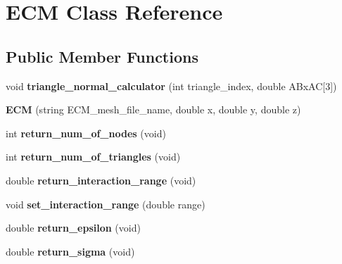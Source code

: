 \hypertarget{classECM}{}\section{E\+CM Class Reference}
\label{classECM}
\subsection*{Public Member Functions}
\begin{DoxyCompactItemize}
\item 
void {\bfseries triangle\+\_\+normal\+\_\+calculator} (int triangle\+\_\+index, double A\+Bx\+AC\mbox{[}3\mbox{]})\hypertarget{classECM_a004ef7f13acbefa4cfa69e0b5dfc57f2}{}\label{classECM_a004ef7f13acbefa4cfa69e0b5dfc57f2}

\item 
{\bfseries E\+CM} (string E\+C\+M\+\_\+mesh\+\_\+file\+\_\+name, double x, double y, double z)\hypertarget{classECM_ae59f09758a280ce73f6657edb2e3b67f}{}\label{classECM_ae59f09758a280ce73f6657edb2e3b67f}

\item 
int {\bfseries return\+\_\+num\+\_\+of\+\_\+nodes} (void)\hypertarget{classECM_afcc6d59c0f53f0e1482a3c8cf86339a6}{}\label{classECM_afcc6d59c0f53f0e1482a3c8cf86339a6}

\item 
int {\bfseries return\+\_\+num\+\_\+of\+\_\+triangles} (void)\hypertarget{classECM_a9eb609680ff7d1d42add41371c770fc2}{}\label{classECM_a9eb609680ff7d1d42add41371c770fc2}

\item 
double {\bfseries return\+\_\+interaction\+\_\+range} (void)\hypertarget{classECM_a5ed1020b0a6ff111386a74b4a7dca96f}{}\label{classECM_a5ed1020b0a6ff111386a74b4a7dca96f}

\item 
void {\bfseries set\+\_\+interaction\+\_\+range} (double range)\hypertarget{classECM_a9c4ea9febf2771ef222cd1430c3bf136}{}\label{classECM_a9c4ea9febf2771ef222cd1430c3bf136}

\item 
double {\bfseries return\+\_\+epsilon} (void)\hypertarget{classECM_ad27417882aba95d19120f2dfaa693d41}{}\label{classECM_ad27417882aba95d19120f2dfaa693d41}

\item 
double {\bfseries return\+\_\+sigma} (void)\hypertarget{classECM_acf88481683c751ded1fb1818a1379990}{}\label{classECM_acf88481683c751ded1fb1818a1379990}

\end{DoxyCompactItemize}
